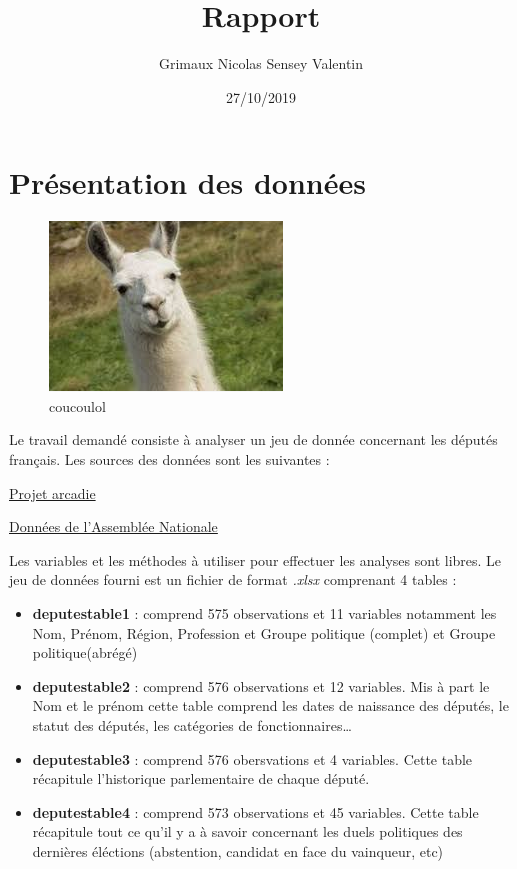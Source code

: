 \documentclass[]{article}
\title{Rapport}
\author{Grimaux Nicolas Sensey Valentin}
\date{27/10/2019}
\providecommand{\tightlist}{%
  \setlength{\itemsep}{0pt}\setlength{\parskip}{0pt}}
\begin{document}
\maketitle

{
\setcounter{tocdepth}{2}
\tableofcontents
}
\hypertarget{pruxe9sentation-des-donnuxe9es}{%
\section{Présentation des
données}\label{pruxe9sentation-des-donnuxe9es}}

\begin{figure}
\centering
\includegraphics{../images/test.png}
\caption{coucoulol}
\end{figure}

Le travail demandé consiste à analyser un jeu de donnée concernant les
députés français. Les sources des données sont les suivantes :

\href{https://projetarcadie.com/tableaux-thematiques}{Projet arcadie}

\href{http://data.assemblee-nationale.fr/}{Données de l'Assemblée
Nationale}

Les variables et les méthodes à utiliser pour effectuer les analyses
sont libres. Le jeu de données fourni est un fichier de format
\emph{.xlsx} comprenant 4 tables :

\begin{itemize}
\tightlist
\item
  \textbf{deputestable1} : comprend 575 observations et 11 variables
  notamment les Nom, Prénom, Région, Profession et Groupe politique
  (complet) et Groupe politique(abrégé)
\item
  \textbf{deputestable2} : comprend 576 observations et 12 variables.
  Mis à part le Nom et le prénom cette table comprend les dates de
  naissance des députés, le statut des députés, les catégories de
  fonctionnaires\ldots{}
\item
  \textbf{deputestable3} : comprend 576 obersvations et 4 variables.
  Cette table récapitule l'historique parlementaire de chaque député.
\item
  \textbf{deputestable4} : comprend 573 observations et 45 variables.
  Cette table récapitule tout ce qu'il y a à savoir concernant les duels
  politiques des dernières éléctions (abstention, candidat en face du
  vainqueur, etc)
\end{itemize}
\end{document}
